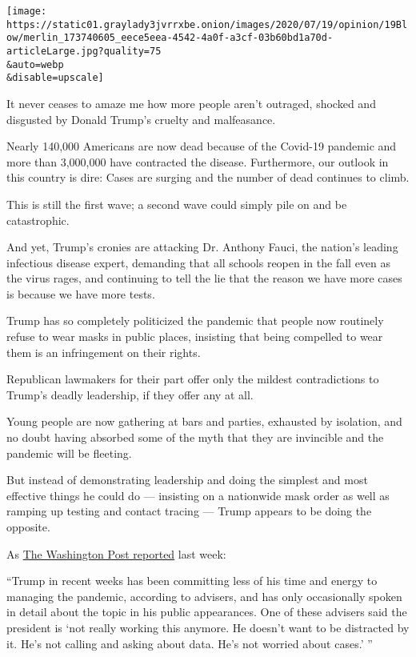 \texttt{[image: https://static01.graylady3jvrrxbe.onion/images/2020/07/19/opinion/19Blow/merlin\_173740605\_eece5eea-4542-4a0f-a3cf-03b60bd1a70d-articleLarge.jpg?quality=75\\\&auto=webp\\\&disable=upscale]}

It never ceases to amaze me how more people aren't outraged, shocked and
disgusted by Donald Trump's cruelty and malfeasance.

Nearly 140,000 Americans are now dead because of the Covid-19 pandemic
and more than 3,000,000 have contracted the disease. Furthermore, our
outlook in this country is dire: Cases are surging and the number of
dead continues to climb.

This is still the first wave; a second wave could simply pile on and be
catastrophic.

And yet, Trump's cronies are attacking Dr. Anthony Fauci, the nation's
leading infectious disease expert, demanding that all schools reopen in
the fall even as the virus rages, and continuing to tell the lie that
the reason we have more cases is because we have more tests.

Trump has so completely politicized the pandemic that people now
routinely refuse to wear masks in public places, insisting that being
compelled to wear them is an infringement on their rights.

Republican lawmakers for their part offer only the mildest
contradictions to Trump's deadly leadership, if they offer any at all.

Young people are now gathering at bars and parties, exhausted by
isolation, and no doubt having absorbed some of the myth that they are
invincible and the pandemic will be fleeting.

But instead of demonstrating leadership and doing the simplest and most
effective things he could do --- insisting on a nationwide mask order as
well as ramping up testing and contact tracing --- Trump appears to be
doing the opposite.

As
\href{https://www.washingtonpost.com/politics/rancor-between-scientists-and-trump-allies-threatens-pandemic-response-as-cases-surge/2020/07/17/d950e9b6-c777-11ea-a99f-3bbdffb1af38_story.html}{The
Washington Post reported} last week:

``Trump in recent weeks has been committing less of his time and energy
to managing the pandemic, according to advisers, and has only
occasionally spoken in detail about the topic in his public appearances.
One of these advisers said the president is `not really working this
anymore. He doesn't want to be distracted by it. He's not calling and
asking about data. He's not worried about cases.' ''

